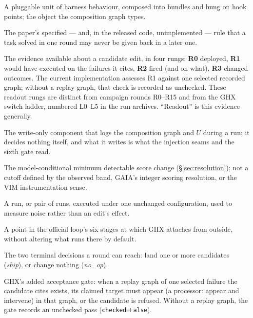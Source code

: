 \begin{description}[leftmargin=1.8em,labelsep=0.4em,itemsep=0.5pt,parsep=0pt,topsep=2pt]
\item[processor] A pluggable unit of harness behaviour, composed into
bundles and hung on hook points; the object the composition graph types.

\item[ratchet] The paper's specified --- and, in the released code,
unimplemented --- rule that a task solved in one round may never be given
back in a later one.

\item[readout / readout ladder (R0--R3)] The evidence available about a
candidate edit, in four rungs: \textbf{R0} deployed, \textbf{R1} would have
executed on the failures it cites, \textbf{R2} fired (and on what),
\textbf{R3} changed outcomes. The current implementation assesses R1
against one selected recorded graph; without a replay graph, that check is
recorded as unchecked. These readout rungs are distinct from campaign
rounds R0--R15 and from the GHX switch ladder, numbered L0--L5 in the run
archives. ``Readout'' is this evidence generally.

\item[recorder] The write-only component that logs the composition graph
and $U$ during a run; it decides nothing itself, and what it writes is what
the injection seams and the sixth gate read.

\item[resolution] The model-conditional minimum detectable score change
(\S\ref{sec:resolution}); not a cutoff defined by the observed band, GAIA's
integer scoring resolution, or the VIM instrumentation sense.

\item[same-configuration window] A run, or pair of runs, executed under
one unchanged configuration, used to measure noise rather than an edit's
effect.

\item[seam] A point in the official loop's six stages at which GHX
attaches from outside, without altering what runs there by default.

\item[ship / \texttt{no\_op}] The two terminal decisions a round can
reach: land one or more candidates (\emph{ship}), or change nothing
(\emph{no\_op}).

\item[sixth gate] GHX's added acceptance gate: when a replay graph of one
selected failure the candidate cites exists, its claimed target must appear
(a processor: appear and intervene) in that graph, or the candidate is
refused. Without a replay graph, the gate records an unchecked pass
(\texttt{checked=False}).


\end{description}
